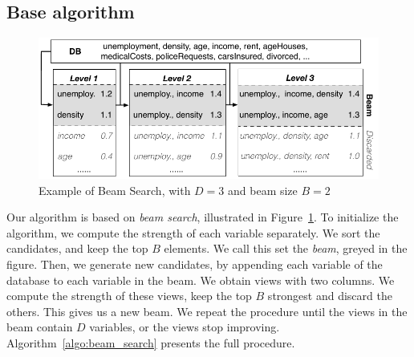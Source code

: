\subsection{Base algorithm}
\label{sec:base}
\begin{figure}[t!]
\centering
\includegraphics[width=\columnwidth]{images/beam-search}
\caption{Example of Beam Search, with $D=3$ and beam size $B=2$}
\label{pic:beam-search}
\end{figure}
Our algorithm is based on \emph{beam search}, illustrated in
Figure~\ref{pic:beam-search}.  To initialize the algorithm, we compute the
strength of each variable separately. We sort the candidates, and keep the top
$B$ elements. We call this set the \emph{beam}, greyed in the figure. Then, we
generate new candidates, by appending each variable of the database to each
variable in the beam. We obtain views with two columns.  We compute the
strength of these views, keep the top $B$ strongest and discard the others.
This gives us a new beam. We repeat the procedure until the views in the beam
contain $D$ variables, or the views stop improving.
Algorithm~\ref{algo:beam_search} presents the full procedure.

